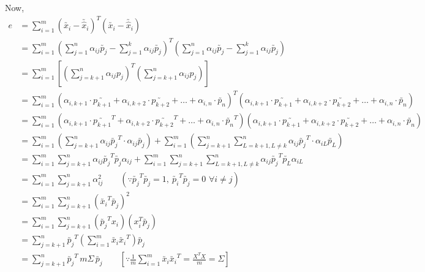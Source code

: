 \documentclass[11pt, a4paper]{article}
\begin{document}
Now, 
\begin{align*}
e &= \sum_{i=1}^{m} (\utilde{x_i} - \utilde{\hat{x}_i})^T (\utilde{x_i} - \utilde{\hat{x}_i}) \\[0.75em]
&= \sum_{i=1}^m \left( \sum_{j=1}^n \alpha_{ij} \utilde{p_j} - \sum_{j=1}^k \alpha_{ij} \utilde{p_j} \right)^T \left( \sum_{j=1}^n \alpha_{ij} \utilde{p_j} - \sum_{j=1}^k \alpha_{ij} \utilde{p_j} \right) \\[0.75em]
&= \sum_{i=1}^m \left[ \left( \sum_{j=k+1}^n \alpha_{ij} p_j \right)^T \left( \sum_{j=k+1}^n \alpha_{ij} p_j \right) \right] \\[0.75em]
&= \sum_{i=1}^m \left( \alpha_{i,k+1} \cdot \utilde{p_{k+1}} + \alpha_{i,k+2} \cdot \utilde{p_{k+2}} + \ldots + \alpha_{i,n} \cdot \utilde{p_n} \right)^T \left( \alpha_{i,k+1} \cdot \utilde{p_{k+1}} + \alpha_{i,k+2} \cdot \utilde{p_{k+2}} + \ldots + \alpha_{i,n} \cdot \utilde{p_n} \right) \\[0.75em]
&= \sum_{i=1}^m \left( \alpha_{i,k+1} \cdot \utilde{p_{k+1}}^T + \alpha_{i,k+2} \cdot \utilde{p_{k+2}}^T + \ldots + \alpha_{i,n} \cdot \utilde{p_n}^T \right) \left( \alpha_{i,k+1} \cdot \utilde{p_{k+1}} + \alpha_{i,k+2} \cdot \utilde{p_{k+2}} + \ldots + \alpha_{i,n} \cdot \utilde{p_n} \right) \\[0.75em]
&= \sum_{i=1}^m \left( \sum_{j=k+1}^n \alpha_{ij} \utilde{p_j}^T \cdot \alpha_{ij} \utilde{p_j} \right) + \sum_{i=1}^m \left( \sum_{j=k+1}^n \sum_{L=k+1, L \neq k}^n \alpha_{ij} \utilde{p_j}^T \cdot \alpha_{iL} \utilde{p_L} \right) \\[0.75em]
&= \sum_{i=1}^m \sum_{j=k+1}^n \alpha_{ij} \utilde{p_j}^T \utilde{p_j} \alpha_{ij} + \sum_{i=1}^m \sum_{j=k+1}^n \sum_{L=k+1, L \neq k}^n \alpha_{ij} \utilde{p_j}^T \utilde{p_L} \alpha_{iL} \\[0.75em]
&= \sum_{i=1}^m \sum_{j=k+1}^n \alpha_{ij}^2 \qquad 
(\because \utilde{p_j}^T \utilde{p_j} = 1, \ \utilde{p_i}^T \utilde{p_j} = 0 \,\, \forall i \neq j)  \\[0.75em]
&= \sum_{i=1}^m \sum_{j=k+1}^n \left( \utilde{x_i}^T \utilde{p_j} \right)^2 \\[0.75em] 
&= \sum_{i=1}^{m} \sum_{j=k+1}^{n} \left( \utilde{p_j}^T x_i \right) \left( x_i^T \utilde{p_j} \right) \\[0.75em]
&= \sum_{j=k+1}^{n} \utilde{p_j}^T \left( \sum_{i=1}^{m} \utilde{x_i} \utilde{x_i}^T \right) \utilde{p_j} \\[0.75em]
&= \sum_{j=k+1}^{n} \utilde{p_j}^T \, m \Sigma \, \utilde{p_j} \qquad \left[ \because \frac{1}{m} \sum_{i=1}^{m} \utilde{x_i} \utilde{x_i}^T = \frac{X^T X}{m} = \Sigma \right]
\end{align*}
\end{document}
